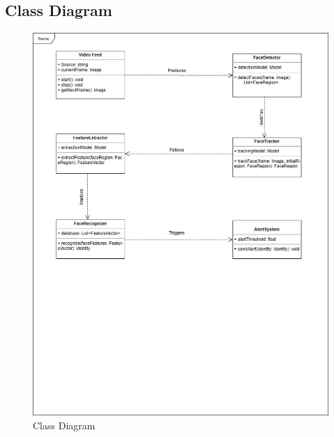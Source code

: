 	\subsection{Class Diagram}
		\begin{figure}[h!]
			\includegraphics[width=\textwidth]{components/images/class.jpeg}
			\caption{Class Diagram}
			\label{fig:class}
		\end{figure}

	\pagebreak


